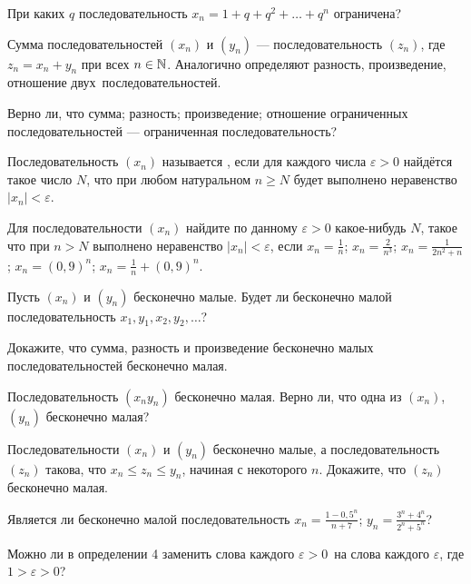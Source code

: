 \documentclass[a4paper, 11pt]{article}
\begin{document}
 При каких $q$ последовательность $x_n=1+q+q^2+\dots+q^n$
ограничена?

 Сумма последовательностей $(x_n)$ и $(y_n)$ ---
последовательность $(z_n)$, где $z_n=x_n+y_n$
при всех $n\in\mathbb{N}$. Аналогично определяют %
разность,
произведение, отношение двух~\hbox{последовательностей.}

 Верно ли, что
 сумма;
 разность;
 произведение;
 отношение ограниченных
последовательностей --- ограниченная последовательность?

 Последовательность $(x_n)$ называется , если
для каждого числа $\varepsilon>0$ найд\"ется такое число $N$,
что при любом натуральном $n\geq N$ будет выполнено неравенство $|x_n|<\varepsilon$.

Для %
последовательности $(x_n)$ найдите
по данному $\varepsilon>0$ какое-нибудь $N$,
такое что при $n>N$ выполнено  неравенство
$|x_n|<\varepsilon$, если
 $x_n = \frac1n$;
 $x_n = \frac2{n^3}$;
 $x_n = \frac1{2n^2+n}$;
 $x_n=(0,9)^n$;
 $x_n=\frac1n+(0,9)^n$.

Пусть $(x_n)$ и $(y_n)$
бесконечно малые. %
Будет ли бесконечно малой последовательность $x_1,y_1,x_2,y_2,\dots$?

Докажите, что сумма, разность и произведение бесконечно малых
последовательностей бесконечно малая.

Последовательность $(x_ny_n)$ бесконечно малая.
Верно ли, что одна из $(x_n)$, $(y_n)$
бесконечно малая?

 Последовательности $(x_n)$ и $(y_n)$
бесконечно малые, а последовательность
$(z_n)$ такова, что $x_n\leq z_n\leq y_n$, начиная с некоторого $n$. Докажите, что $(z_n)$ бесконечно малая.

 Является ли бесконечно малой последовательность
$x_n=\frac{1-0,5^n}{n+7}$;
$y_n=\frac{3^n+4^n}{2^n+5^n}$?

Можно ли в определении 4 заменить слова  каждого $\varepsilon>0$\
на слова  каждого $\varepsilon$, где $1>\varepsilon>0$?
\end{document}

